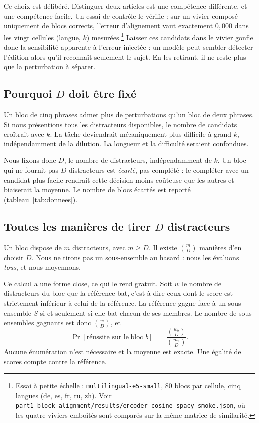 \documentclass[11pt]{article}
\newcommand{\code}[1]{\texttt{\small #1}}
\begin{document}
Ce choix est délibéré.
Distinguer deux articles est une compétence différente, et une compétence facile.
Un essai de contrôle le vérifie : sur un vivier composé uniquement de blocs corrects, l'erreur d'alignement vaut exactement $0{,}000$ dans les vingt cellules (langue, $k$) mesurées.\footnote{Essai à petite échelle : \code{multilingual-e5-small}, 80 blocs par cellule, cinq langues (de, es, fr, ru, zh). Voir \code{part1\_block\_alignment/results/encoder\_cosine\_spacy\_smoke.json}, où les quatre viviers emboîtés sont comparés sur la même matrice de similarité.}
Laisser ces candidats dans le vivier gonfle donc la sensibilité apparente à l'erreur injectée : un modèle peut sembler détecter l'édition alors qu'il reconnaît seulement le sujet.
En les retirant, il ne reste plus que la perturbation à séparer.

\subsection{Pourquoi $D$ doit être fixé}

Un bloc de cinq phrases admet plus de perturbations qu'un bloc de deux phrases.
Si nous présentions tous les distracteurs disponibles, le nombre de candidats croîtrait avec $k$.
La tâche deviendrait mécaniquement plus difficile à grand $k$, indépendamment de la dilution.
La longueur et la difficulté seraient confondues.

Nous fixons donc $D$, le nombre de distracteurs, indépendamment de $k$.
Un bloc qui ne fournit pas $D$ distracteurs est \emph{écarté}, pas complété : le compléter avec un candidat plus facile rendrait cette décision moins coûteuse que les autres et biaiserait la moyenne.
Le nombre de blocs écartés est reporté (tableau~\ref{tab:donnees}).

\subsection{Toutes les manières de tirer $D$ distracteurs}

Un bloc dispose de $m$ distracteurs, avec $m \ge D$.
Il existe $\binom{m}{D}$ manières d'en choisir $D$.
Nous ne tirons pas un sous-ensemble au hasard : nous les évaluons \emph{tous}, et nous moyennons.

Ce calcul a une forme close, ce qui le rend gratuit.
Soit $w$ le nombre de distracteurs du bloc que la référence bat, c'est-à-dire ceux dont le score est strictement inférieur à celui de la référence.
La référence gagne face à un sous-ensemble $S$ si et seulement si elle bat chacun de ses membres.
Le nombre de sous-ensembles gagnants est donc $\binom{w}{D}$, et
\[
\Pr[\text{réussite sur le bloc } b] \;=\; \frac{\binom{w_b}{D}}{\binom{m_b}{D}} .
\]
Aucune énumération n'est nécessaire et la moyenne est exacte.
Une égalité de scores compte contre la référence.
\end{document}
